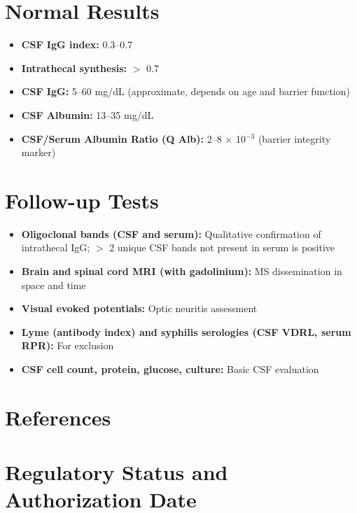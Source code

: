 \section*{Normal Results}
\begin{itemize}
  \item \textbf{CSF IgG index:} 0.3--0.7
  \item \textbf{Intrathecal synthesis:} $>$ 0.7
  \item \textbf{CSF IgG:} 5--60 mg/dL (approximate, depends on age and barrier function)
  \item \textbf{CSF Albumin:} 13--35 mg/dL
  \item \textbf{CSF/Serum Albumin Ratio (Q Alb):} 2--8 $\times$ 10$^{-3}$ (barrier integrity marker)
\end{itemize}

\section*{Follow-up Tests}
\begin{itemize}
  \item \textbf{Oligoclonal bands (CSF and serum):} Qualitative confirmation of intrathecal IgG; $>$ 2 unique CSF bands not present in serum is positive
  \item \textbf{Brain and spinal cord MRI (with gadolinium):} MS dissemination in space and time
  \item \textbf{Visual evoked potentials:} Optic neuritis assessment
  \item \textbf{Lyme (antibody index) and syphilis serologies (CSF VDRL, serum RPR):} For exclusion
  \item \textbf{CSF cell count, protein, glucose, culture:} Basic CSF evaluation
\end{itemize}

\section*{References}



\clearpage
\section*{Regulatory Status and Authorization Date}

\clearpage
